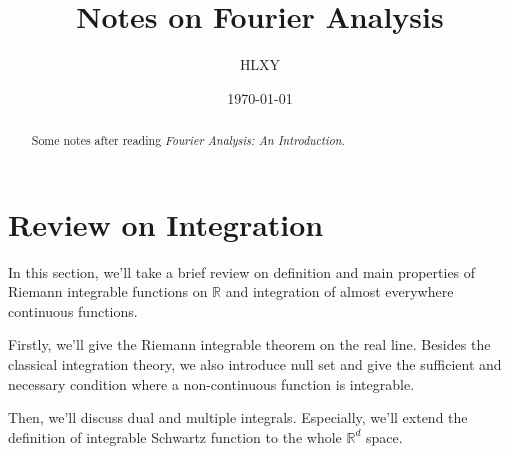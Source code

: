 \documentclass[a4paper]{article}
\title{Notes on Fourier Analysis}
\author{HLXY}
\date{\today}
\numberwithin{equation}{subsection}
\begin{document}
\maketitle
\begin{abstract}
    Some notes after reading \textit{Fourier Analysis: An Introduction}.
\end{abstract}
\tableofcontents

\section{Review on Integration}
\par In this section, we'll take a brief review on definition and main properties of Riemann integrable functions on $\mathbb{R}$ and integration of almost everywhere continuous functions.
\par Firstly, we'll give the Riemann integrable theorem on the real line. Besides the classical integration theory, we also introduce null set and give the sufficient and necessary condition where a non-continuous function is integrable.
\par Then, we'll discuss dual and multiple integrals. Especially, we'll extend the definition of integrable Schwartz function to the whole $\mathbb{R}^d$ space.
\end{document}
